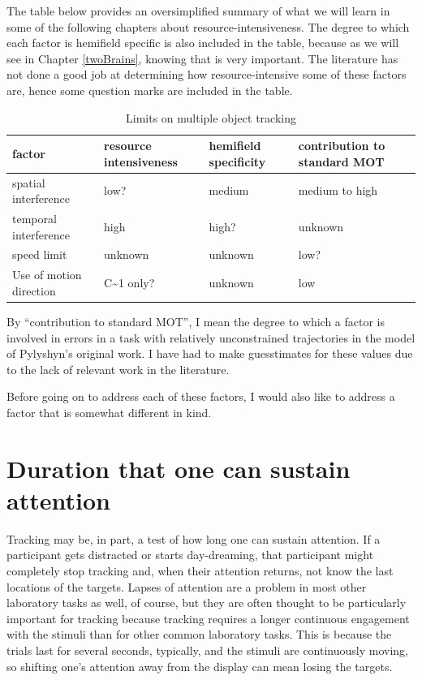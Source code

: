 \documentclass[
]{book}
\begin{document}
The table below provides an oversimplified summary of what we will learn in some of the following chapters about resource-intensiveness. The degree to which each factor is hemifield specific is also included in the table, because as we will see in Chapter \ref{twoBrains}, knowing that is very important. The literature has not done a good job at determining how resource-intensive some of these factors are, hence some question marks are included in the table.

\begin{table}

\caption{\label{tab:table-limits}Limits on multiple object tracking}
\centering
\begin{tabular}[t]{llll}
\toprule
factor & resource intensiveness & hemifield specificity & contribution to standard MOT\\
\midrule
spatial interference & low? & medium & medium to high\\
temporal interference & high & high? & unknown\\
speed limit & unknown & unknown & low?\\
Use of motion direction & C\textasciitilde{}1 only? & unknown & low\\
\bottomrule
\end{tabular}
\end{table}

By ``contribution to standard MOT'', I mean the degree to which a factor is involved in errors in a task with relatively unconstrained trajectories in the model of Pylyshyn's original work. I have had to make guesstimates for these values due to the lack of relevant work in the literature.

Before going on to address each of these factors, I would also like to address a factor that is somewhat different in kind.

\hypertarget{duration-that-one-can-sustain-attention}{%
\section{Duration that one can sustain attention}\label{duration-that-one-can-sustain-attention}}

Tracking may be, in part, a test of how long one can sustain attention. If a participant gets distracted or starts day-dreaming, that participant might completely stop tracking and, when their attention returns, not know the last locations of the targets. Lapses of attention are a problem in most other laboratory tasks as well, of course, but they are often thought to be particularly important for tracking because tracking requires a longer continuous engagement with the stimuli than for other common laboratory tasks. This is because the trials last for several seconds, typically, and the stimuli are continuously moving, so shifting one's attention away from the display can mean losing the targets.
\end{document}
